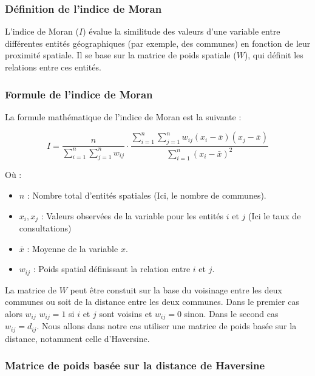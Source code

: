 \subsubsection{Définition de l'indice de
Moran}\label{duxe9finition-de-lindice-de-moran}

L'indice de Moran (\(I\)) évalue la similitude des valeurs d'une
variable entre différentes entités géographiques (par exemple, des
communes) en fonction de leur proximité spatiale. Il se base sur la
matrice de poids spatiale (\(W\)), qui définit les relations entre ces
entités.

\subsubsection{Formule de l'indice de
Moran}\label{formule-de-lindice-de-moran}

La formule mathématique de l'indice de Moran est la suivante :

\[
I = \frac{n}{\sum_{i=1}^n \sum_{j=1}^n w_{ij}} \cdot \frac{\sum_{i=1}^n \sum_{j=1}^n w_{ij} (x_i - \bar{x})(x_j - \bar{x})}{\sum_{i=1}^n (x_i - \bar{x})^2}
\]

Où :

\begin{itemize}
\item
  \(n\) : Nombre total d'entités spatiales (Ici, le nombre de communes).
\item
  \(x_i, x_j\) : Valeurs observées de la variable pour les entités \(i\)
  et \(j\) (Ici le taux de consultations)
\item
  \(\bar{x}\) : Moyenne de la variable \(x\).
\item
  \(w_{ij}\) : Poids spatial définissant la relation entre \(i\) et
  \(j\).
\end{itemize}

La matrice de \(W\) peut être constuit sur la base du voisinage entre
les deux communes ou soit de la distance entre les deux communes. Dans
le premier cas alors \(w_{ij}\) \(w_{ij} = 1\) si \(i\) et \(j\) sont
voisins et \(w_{ij} = 0\) sinon. Dans le second cas \(w_{ij} = d_{ij}\).
Nous allons dans notre cas utiliser une matrice de poids basée sur la
distance, notamment celle d'Haversine.

\subsubsection{Matrice de poids basée sur la distance de
Haversine}\label{matrice-de-poids-basuxe9e-sur-la-distance-de-haversine}

